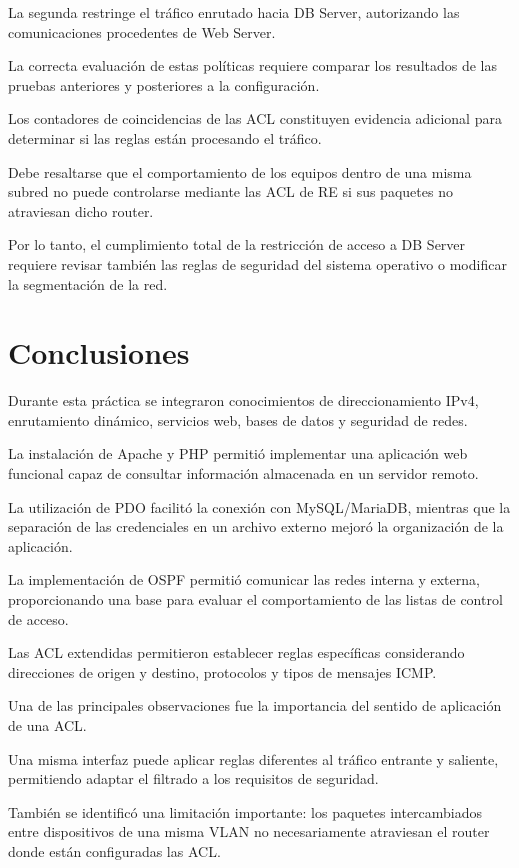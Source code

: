 \documentclass[12pt,a4paper]{article}
\begin{document}
La segunda restringe
el tráfico enrutado
hacia DB Server,
autorizando las comunicaciones
procedentes de Web Server.

La correcta evaluación
de estas políticas requiere
comparar los resultados
de las pruebas anteriores
y posteriores a la configuración.

Los contadores de coincidencias
de las ACL constituyen
evidencia adicional para
determinar si las reglas
están procesando el tráfico.

Debe resaltarse que
el comportamiento de los
equipos dentro de una misma
subred no puede controlarse
mediante las ACL de RE
si sus paquetes no atraviesan
dicho router.

Por lo tanto, el cumplimiento
total de la restricción
de acceso a DB Server
requiere revisar también
las reglas de seguridad
del sistema operativo
o modificar la segmentación
de la red.

\section{Conclusiones}

Durante esta práctica
se integraron conocimientos
de direccionamiento IPv4,
enrutamiento dinámico,
servicios web,
bases de datos y
seguridad de redes.

La instalación de Apache
y PHP permitió implementar
una aplicación web funcional
capaz de consultar información
almacenada en un servidor remoto.

La utilización de PDO
facilitó la conexión
con MySQL/MariaDB,
mientras que la separación
de las credenciales
en un archivo externo
mejoró la organización
de la aplicación.

La implementación de OSPF
permitió comunicar
las redes interna y externa,
proporcionando una base
para evaluar el comportamiento
de las listas de control
de acceso.

Las ACL extendidas
permitieron establecer
reglas específicas
considerando direcciones
de origen y destino,
protocolos y tipos
de mensajes ICMP.

Una de las principales
observaciones fue
la importancia del sentido
de aplicación de una ACL.

Una misma interfaz
puede aplicar reglas
diferentes al tráfico
entrante y saliente,
permitiendo adaptar
el filtrado a los
requisitos de seguridad.

También se identificó
una limitación importante:
los paquetes intercambiados
entre dispositivos
de una misma VLAN
no necesariamente atraviesan
el router donde están
configuradas las ACL.
\end{document}
